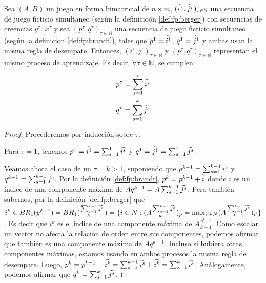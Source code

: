 \begin{lemma} \label{lema:equiv:sim}
    Sea $(A, B)$ un juego en forma bimatricial de $n \times m$, $(\widetilde{i^\tau}, \widetilde{j^\tau})_{\tau \in \mathbb{N}}$ una secuencia de juego ficticio simultaneo (según la definicioón \ref{def:fp:berger}) con secuencias de creencias $y^\tau$, $x^\tau$ y sea $(p^\tau, q^\tau)_{\tau \in \mathbb{N}}$ una secuencia de juego ficticio simultaneo (según la definicion \ref{def:fp:brandt}), tales que $p^1 = \widetilde{i^1}$, $q^1 = \widetilde{j^1}$ y ambas usan la misma regla de desempate. Entonces, $(i^\tau, j^\tau)_{\tau \in \mathbb{N}}$ y $(p^\tau, q^\tau)_{\tau \in \mathbb{N}}$ representan el mismo proceso de aprendizaje. Es decir, $\forall \tau \in \mathbb{N}$, se cumplen:

    \[ p^{\tau} = \sum_{s=1}^\tau{\widetilde{i^s}} \]
    \[ q^{\tau} = \sum_{s=1}^\tau{\widetilde{j^s}} \]

\end{lemma}
\begin{proof}
    Procederemos por inducción sobre $\tau$.

    Para $\tau = 1$, tenemos $p^1 = \widetilde{i^1} = \sum_{s=1}^1{\widetilde{i^s}}$ y $q^1 = \widetilde{j^1} = \sum_{s=1}^1{\widetilde{j^s}}$.

    Veamos ahora el caso de un $\tau = k > 1$, suponiendo que $p^{k-1} = \sum_{s=1}^{k-1}{\widetilde{i^s}}$ y $q^{k-1} = \sum_{s=1}^{k-1}{\widetilde{j^s}}$. Por la definición \ref{def:fp:brandt}, $p^k = p^{k-1} + \widetilde{i}$ donde $i$ es un índice de una componente máxima de $Aq^{k-1} = A\sum_{s=1}^{k-1}{\widetilde{j^s}}$. Pero también sabemos, por la definición \ref{def:fp:berger} que $i^k \in BR_1(y^{k-1}) = BR_1(\frac{\sum_{s=1}^{k-1} \widetilde{j^s}}{k-1}) = \{i \in N : (A\frac{\sum_{s=1}^{k-1} \widetilde{j^s}}{k-1})_p = \max_{i' \in N} (A\frac{\sum_{s=1}^{k-1} \widetilde{j^s}}{k-1})_{i'}\}$. Es decir que $i^k$ es el índice de una componente máxima de $A\frac{q^{k-1}}{k-1}$. Como escalar un vector no afecta la relación de orden entre sus componentes, podemos afirmar que también es una componente máxima de $Aq^{k-1}$. Incluso si hubiera otras componentes máximas, estamos usando en ambos procesos la misma regla de desempate. Luego, $p^k = p^{k-1} + \widetilde{i^k} = \sum_{s=1}^{k-1}{\widetilde{i^s}} + \widetilde{i^k} = \sum_{s=1}^{k}{\widetilde{i^s}}$. Análogamente, podemos afirmar que $q^{k} = \sum_{s=1}^k{\widetilde{j^s}}$.
\end{proof}

